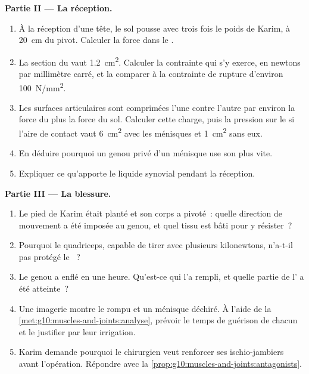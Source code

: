\begin{problem}
\medskip
\noindent\textbf{Partie II --- La réception.}
\begin{enumerate}[resume]
  \item À la réception d'une tête, le sol pousse avec trois fois le
        poids de Karim, à \qty{20}{cm} du pivot. Calculer la force dans
        le .
  \item La section du  vaut \qty{1.2}{cm^2}. Calculer la
        contrainte qui s'y exerce, en newtons par millimètre carré, et
        la comparer à la contrainte de rupture d'environ
        \qty{100}{N/mm^2}.
  \item Les surfaces articulaires sont comprimées l'une contre l'autre
        par environ la force du  plus la force du sol. Calculer
        cette charge, puis la pression sur le  si l'aire de
        contact vaut \qty{6}{cm^2} avec les ménisques et
        \qty{1}{cm^2} sans eux.
  \item En déduire pourquoi un genou privé d'un ménisque use son
         plus vite.
  \item Expliquer ce qu'apporte le liquide synovial pendant la
        réception.
\end{enumerate}

\medskip
\noindent\textbf{Partie III --- La blessure.}
\begin{enumerate}[resume]
  \item Le pied de Karim était planté et son corps a pivoté~: quelle
        direction de mouvement a été imposée au genou, et quel tissu
        est bâti pour y résister~?
  \item Pourquoi le quadriceps, capable de tirer avec plusieurs
        kilonewtons, n'a-t-il pas protégé le ~?
  \item Le genou a enflé en une heure. Qu'est-ce qui l'a rempli, et
        quelle partie de l' a été atteinte~?
  \item Une imagerie montre le  rompu et un ménisque déchiré.
        À l'aide de la \cref{met:g10:muscles-and-joints:analyse},
        prévoir le temps de guérison de chacun et le justifier par leur
        irrigation.
  \item Karim demande pourquoi le chirurgien veut renforcer ses
        ischio-jambiers avant l'opération. Répondre avec la
        \cref{prop:g10:muscles-and-joints:antagonists}.
\end{enumerate}


\end{problem}
